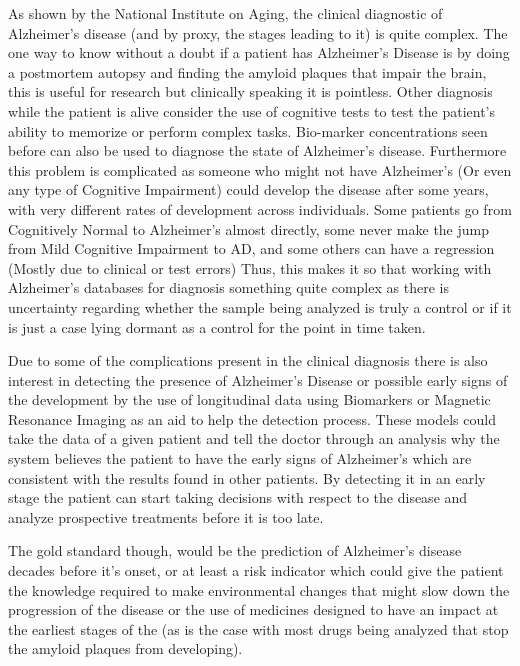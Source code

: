 As shown by the National Institute on Aging\cite{McKhann2011}, the clinical diagnostic of Alzheimer's disease (and by proxy, the stages leading to it) is quite complex. The one way to know without a doubt if a patient has Alzheimer's Disease is by doing a postmortem autopsy and finding the amyloid plaques that impair the brain, this is useful for research but clinically speaking it is pointless. Other diagnosis while the patient is alive consider the use of cognitive tests to test the patient's ability to memorize or perform complex tasks. Bio-marker concentrations seen before can also be used to diagnose the state of Alzheimer's disease. Furthermore this problem is complicated as someone who might not have Alzheimer's (Or even any type of Cognitive Impairment) could develop the disease after some years, with very different rates of development across individuals. Some patients go from Cognitively Normal to Alzheimer's almost directly, some never make the jump from Mild Cognitive Impairment to AD, and some others can have a regression (Mostly due to clinical or test errors) Thus, this makes it so that working with Alzheimer's databases for diagnosis something quite complex as there is uncertainty regarding whether the sample being analyzed is truly a control or if it is just a case lying dormant as a control for the point in time taken.

Due to some of the complications present in the clinical diagnosis there is also interest in detecting the presence of Alzheimer's Disease or possible early signs of the development by the use of longitudinal data using Biomarkers or Magnetic Resonance Imaging as an aid to help the detection process. These models could take the data of a given patient and tell the doctor through an analysis why the system believes the patient to have the early signs of Alzheimer's which are consistent with the results found in other patients. By detecting it in an early stage the patient can start taking decisions with respect to the disease and analyze prospective treatments before it is too late.

The gold standard though, would be the prediction of Alzheimer's disease decades before it's onset, or at least a risk indicator which could give the patient the knowledge required to make environmental changes that might slow down the progression of the disease or the use of medicines designed to have an impact at the earliest stages of the (as is the case with most drugs being analyzed that stop the amyloid plaques from developing). 
\clearpage


